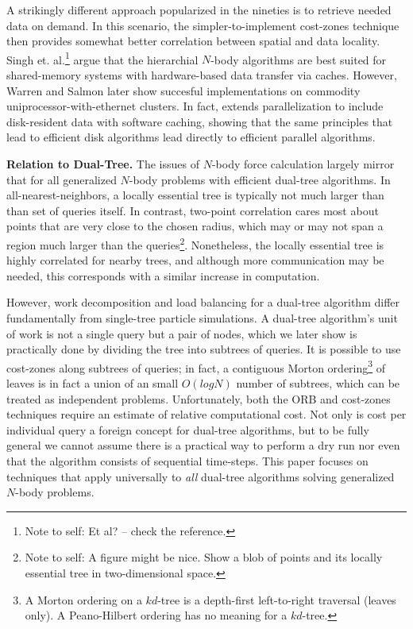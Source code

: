 \documentclass[times, leqno,twocolumn]{article}
\newcommand{\authornote}[1]{\footnote{Note to self: #1}}
\newcommand{\authorsnote}[1]{\authornote{#1}}
\begin{document}
A strikingly different approach popularized in the nineties is to retrieve needed data on demand.
In this scenario, the simpler-to-implement cost-zones technique then provides somewhat better correlation between spatial and data locality.
Singh et. al.\authornote{Et al? -- check the reference.} \cite{singh95load, singh92implications} argue that the hierarchial $N$-body algorithms are best suited for shared-memory systems with hardware-based data transfer via caches.
However, Warren and Salmon later \cite{warren93parallel,salmon97parallel} show succesful implementations on commodity uniprocessor-with-ethernet clusters.
In fact, \cite{salmon97parallel} extends parallelization to include disk-resident data with software caching, showing that the same principles that lead to efficient disk algorithms lead directly to efficient parallel algorithms.

{\bf Relation to Dual-Tree.}
The issues of $N$-body force calculation largely mirror that for all generalized $N$-body problems with efficient dual-tree algorithms.
In all-nearest-neighbors, a locally essential tree is typically not much larger than than set of queries itself.
In contrast, two-point correlation cares most about points that are very close to the chosen radius, which may or may not span a region much larger than the queries\authorsnote{A figure might be nice.  Show a blob of points and its locally essential tree in two-dimensional space.}.
Nonetheless, the locally essential tree is highly correlated for nearby trees, and although more communication may be needed, this corresponds with a similar increase in computation.

However, work decomposition and load balancing for a dual-tree algorithm differ fundamentally from single-tree particle simulations.
A dual-tree algorithm's unit of work is not a single query but a pair of nodes, which we later show is practically done by dividing the tree into subtrees of queries.
It is possible to use cost-zones along subtrees of queries; in fact, a contiguous Morton ordering\footnote{A Morton ordering on a $kd$-tree is a depth-first left-to-right traversal (leaves only).  A Peano-Hilbert ordering has no meaning for a $kd$-tree.} of leaves is in fact a union of an small $O(log N)$ number of subtrees, which can be treated as independent problems.
Unfortunately, both the ORB and cost-zones techniques require an estimate of relative computational cost.
Not only is cost per individual query a foreign concept for dual-tree algorithms, but to be fully general we cannot assume there is a practical way to perform a dry run nor even that the algorithm consists of sequential time-steps.
This paper focuses on techniques that apply universally to {\it all} dual-tree algorithms solving generalized $N$-body problems.
\end{document}
